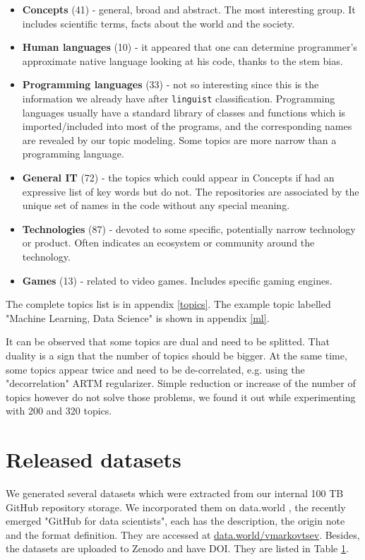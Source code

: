 \documentclass[conference,10pt]{IEEEtran}
\begin{document}
\begin{itemize}
\item \textbf{Concepts} (41) - general, broad and abstract. The most interesting group. It includes scientific terms, facts about the world and the society.
\item \textbf{Human languages} (10) - it appeared that one can determine programmer’s approximate native language looking at his code, thanks to the stem bias.
\item \textbf{Programming languages} (33) - not so interesting since this is the information we already have after \texttt{linguist} classification. Programming languages usually have a standard library of classes and functions which is imported/included into most of the programs, and the corresponding names are revealed by our topic modeling. Some topics are more narrow than a programming language.
\item \textbf{General IT} (72) - the topics which could appear in Concepts if had an expressive list of key words but do not. The repositories are associated by the unique set of names in the code without any special meaning.
\item \textbf{Technologies} (87) - devoted to some specific, potentially narrow technology or product. Often indicates an ecosystem or community around the technology.
\item \textbf{Games} (13) - related to video games. Includes specific gaming engines.
\end{itemize}

The complete topics list is in appendix \ref{topics}. The example topic labelled "Machine Learning, Data Science" is shown in appendix \ref{ml}.

\label{duplicateexpl}It can be observed that some topics are dual and need to be splitted. That duality is a sign that the number of topics should be bigger. At the same time, some topics appear twice and need to be de-correlated, e.g. using the "decorrelation" ARTM regularizer. Simple reduction or increase of the number of topics however do not solve those problems, we found it out while experimenting with 200 and 320 topics.

\section{Released datasets} \label{datasets}
We generated several datasets which were extracted from our internal 100 TB GitHub repository storage. We incorporated them on data.world \cite{data_world}, the recently emerged "GitHub for data scientists", each has the description, the origin note and the format definition. They are accessed at \href{https://data.world/vmarkovtsev}{data.world/vmarkovtsev}. Besides, the datasets are uploaded to Zenodo and have DOI. They are listed in Table \ref{datasets}.
\end{document}
